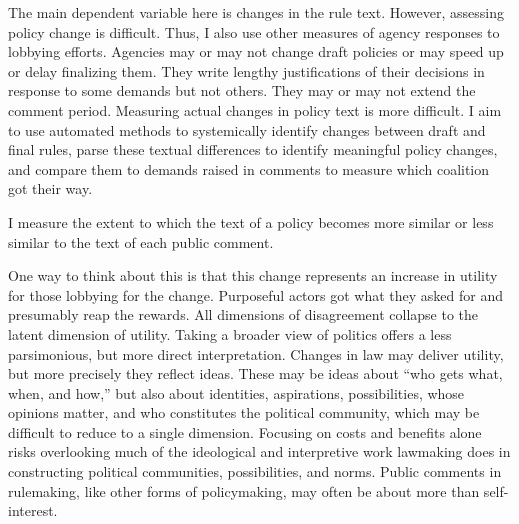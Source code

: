 

The main dependent variable here is changes in the rule text. However, assessing policy change is difficult. Thus, I also use other measures of agency responses to lobbying efforts. 
Agencies may or may not change draft policies or may speed up or delay finalizing them. They write lengthy justifications of their decisions in response to some demands but not others. They may or may not extend the comment period. Measuring actual changes in policy text is more difficult. I aim to use automated methods to systemically identify changes between draft and final rules, parse these textual differences to identify meaningful policy changes, and compare them to demands raised in comments to measure which coalition got their way.


I measure the extent to which the text of a policy becomes more similar or less similar to the text of each public comment. 

One way to think about this is that this change represents an increase in utility for those lobbying for the change. Purposeful actors got what they asked for and presumably reap the rewards. All dimensions of disagreement collapse to the latent dimension of utility. %
Taking a broader view of politics offers a less parsimonious, but more direct interpretation. Changes in law may deliver utility, but more precisely they reflect ideas. These may be ideas about ``who gets what, when, and how,'' but also about identities, aspirations, possibilities, whose opinions matter, and who constitutes the political community, which may be difficult to reduce to a single dimension. Focusing on costs and benefits alone risks overlooking much of the ideological and interpretive work lawmaking does in constructing political communities, possibilities, and norms. Public comments in rulemaking, like other forms of policymaking, may often be about more than self-interest. 

